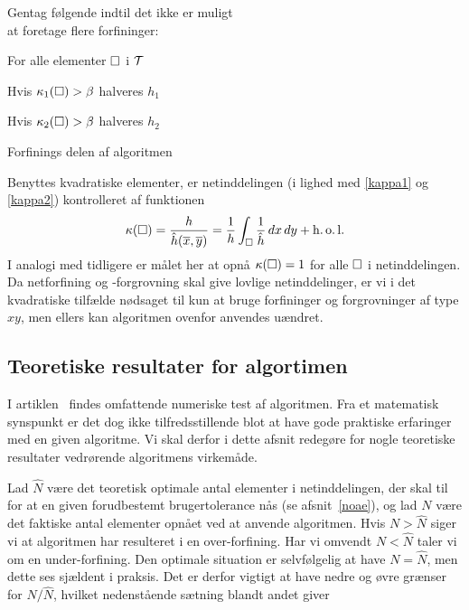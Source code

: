 \begin{Algoritme}[H]
\begin{emptylist}
\setlength{\itemsep}{0cm}
\setlength{\parsep}{0cm}
  \item Gentag følgende indtil det ikke er muligt \\ 
        \makebox[.25in][r]{} at foretage flere forfininger:
  \item For alle elementer $\Box$ i $\mathcal T$
  \item \makebox[.25in][r]{} Hvis $\kappa_1(\Box)>\beta$ halveres $h_1$
  \item \makebox[.25in][r]{} Hvis $\kappa_2(\Box)>\beta$ halveres $h_2$
\end{emptylist}
\caption{Forfinings delen af algoritmen\label{forfin}}
\end{Algoritme}

Benyttes kvadratiske elementer, er netinddelingen (i lighed med
\eqref{kappa1} og \eqref{kappa2}) kontrolleret af funktionen 
\begin{equation}
  \kappa (\Box ) = \frac{h}{\hat{h}(\overline{x},\overline{y})} =
  \frac{1}{h} \int_\Box \frac{1}{\hat{h}}\, dx\, dy + \operatorname{h.o.l.}
\end{equation}
I analogi med tidligere er målet her at opnå $\kappa(\Box )=1$ for alle
$\Box$ i netinddelingen. Da netforfining og -forgrovning skal give
lovlige netinddelinger, er vi i det kvadratiske tilfælde nødsaget til
kun at bruge forfininger og forgrovninger af type $xy$, men ellers kan
algoritmen ovenfor anvendes uændret. 

\subsection{Teoretiske resultater for algortimen} \label{teorires}
I artiklen~\cite{hugger-net} findes omfattende numeriske test af
algoritmen. Fra et matematisk synspunkt er det dog ikke
tilfredsstillende blot at have gode praktiske erfaringer med en given
algoritme. Vi skal derfor i dette afsnit redegøre for nogle teoretiske
resultater vedrørende algoritmens virkemåde. 

Lad $\hat{N}$ være det teoretisk optimale antal elementer i
netinddelingen, der skal til for at en given forudbestemt
brugertolerance nås (se afsnit~\ref{noae}), og lad $N$ være det faktiske antal elementer
opnået ved at anvende algoritmen. Hvis $N>\hat{N}$ siger vi at
algoritmen har resulteret i en over-forfining. Har vi omvendt
$N<\hat{N}$ taler vi om en under-forfining. Den optimale situation er
selvfølgelig at have $N=\hat{N}$, men dette ses sjældent i praksis.
Det er derfor vigtigt at have nedre og øvre grænser for $N/\hat{N}$,
hvilket nedenstående sætning blandt andet giver  

